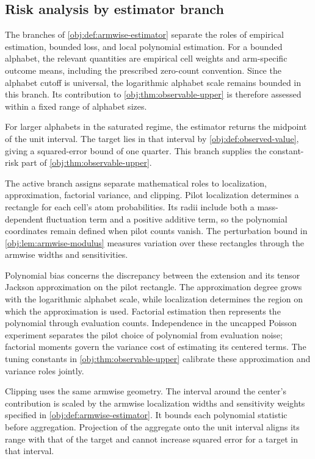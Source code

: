 \documentclass[11pt]{article}
\begin{document}
\subsection{Risk analysis by estimator branch}

The branches of \cref{obj:def:armwise-estimator} separate the roles of empirical estimation, bounded loss, and local polynomial estimation. For a bounded alphabet, the relevant quantities are empirical cell weights and arm-specific outcome means, including the prescribed zero-count convention. Since the alphabet cutoff is universal, the logarithmic alphabet scale remains bounded in this branch. Its contribution to \cref{obj:thm:observable-upper} is therefore assessed within a fixed range of alphabet sizes.

For larger alphabets in the saturated regime, the estimator returns the midpoint of the unit interval. The target lies in that interval by \cref{obj:def:observed-value}, giving a squared-error bound of one quarter. This branch supplies the constant-risk part of \cref{obj:thm:observable-upper}.

The active branch assigns separate mathematical roles to localization, approximation, factorial variance, and clipping. Pilot localization determines a rectangle for each cell's atom probabilities. Its radii include both a mass-dependent fluctuation term and a positive additive term, so the polynomial coordinates remain defined when pilot counts vanish. The perturbation bound in \cref{obj:lem:armwise-modulus} measures variation over these rectangles through the armwise widths and sensitivities.

Polynomial bias concerns the discrepancy between the extension and its tensor Jackson approximation on the pilot rectangle. The approximation degree grows with the logarithmic alphabet scale, while localization determines the region on which the approximation is used. Factorial estimation then represents the polynomial through evaluation counts. Independence in the uncapped Poisson experiment separates the pilot choice of polynomial from evaluation noise; factorial moments govern the variance cost of estimating its centered terms. The tuning constants in \cref{obj:thm:observable-upper} calibrate these approximation and variance roles jointly.

Clipping uses the same armwise geometry. The interval around the center's contribution is scaled by the armwise localization widths and sensitivity weights specified in \cref{obj:def:armwise-estimator}. It bounds each polynomial statistic before aggregation. Projection of the aggregate onto the unit interval aligns its range with that of the target and cannot increase squared error for a target in that interval.
\end{document}
